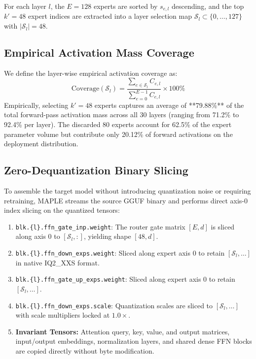 \documentclass[conference]{IEEEtran}
\newcommand{\MAPLE}{\textsc{MAPLE}}
\begin{document}
For each layer $l$, the $E=128$ experts are sorted by $s_{e,l}$ descending, and the top $k'=48$ expert indices are extracted into a layer selection map $\mathcal{S}_l \subset \{0, \ldots, 127\}$ with $|\mathcal{S}_l| = 48$.

\subsection{Empirical Activation Mass Coverage}
We define the layer-wise empirical activation coverage as:
\begin{equation}
\text{Coverage}(\mathcal{S}_l) = \frac{\sum_{e \in \mathcal{S}_l} C_{e,l}}{\sum_{e=0}^{E-1} C_{e,l}} \times 100\%
\end{equation}
Empirically, selecting $k'=48$ experts captures an average of **79.88\%** of the total forward-pass activation mass across all 30 layers (ranging from 71.2\% to 92.4\% per layer). The discarded 80 experts account for 62.5\% of the expert parameter volume but contribute only 20.12\% of forward activations on the deployment distribution.

\subsection{Zero-Dequantization Binary Slicing}
To assemble the target model without introducing quantization noise or requiring retraining, \MAPLE{} streams the source GGUF binary and performs direct axis-0 index slicing on the quantized tensors:
\begin{enumerate}
\item \texttt{blk.\{l\}.ffn\_gate\_inp.weight}: The router gate matrix $[E, d]$ is sliced along axis 0 to $[\mathcal{S}_l, :]$, yielding shape $[48, d]$.
\item \texttt{blk.\{l\}.ffn\_down\_exps.weight}: Sliced along expert axis 0 to retain $[\mathcal{S}_l, \ldots]$ in native IQ2\_XXS format.
\item \texttt{blk.\{l\}.ffn\_gate\_up\_exps.weight}: Sliced along expert axis 0 to retain $[\mathcal{S}_l, \ldots]$.
\item \texttt{blk.\{l\}.ffn\_down\_exps.scale}: Quantization scales are sliced to $[\mathcal{S}_l, \ldots]$ with scale multipliers locked at $1.0\times$.
\item \textbf{Invariant Tensors:} Attention query, key, value, and output matrices, input/output embeddings, normalization layers, and shared dense FFN blocks are copied directly without byte modification.
\end{enumerate}
\end{document}
